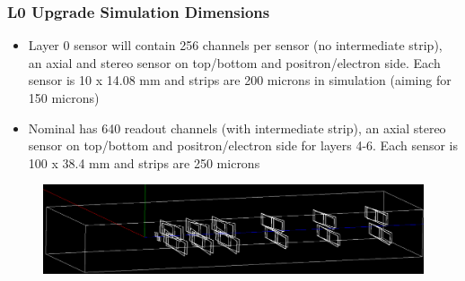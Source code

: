 \documentclass{beamer}
\begin{document}





\begin{frame}
\frametitle{L0 Upgrade Simulation Dimensions}
\begin{itemize}
\item Layer 0 sensor will contain 256 channels per sensor (no intermediate strip), an axial and stereo sensor on top/bottom and positron/electron side. Each sensor is 10 x 14.08 mm and strips are 200 microns in simulation (aiming for 150 microns)
\item Nominal has 640 readout channels (with intermediate strip), an axial stereo sensor on top/bottom and positron/electron side for layers 4-6. Each sensor is 100 x 38.4 mm and strips are 250 microns
\end{itemize}
\begin{figure}
\includegraphics[width=0.8\linewidth]{figs/L0_schematic.PNG}
\end{figure}

\end{frame}

\end{document}
